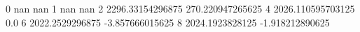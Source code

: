 0 nan nan
1 nan nan
2 2296.33154296875 270.220947265625
4 2026.110595703125 0.0
6 2022.2529296875 -3.857666015625
8 2024.1923828125 -1.918212890625
